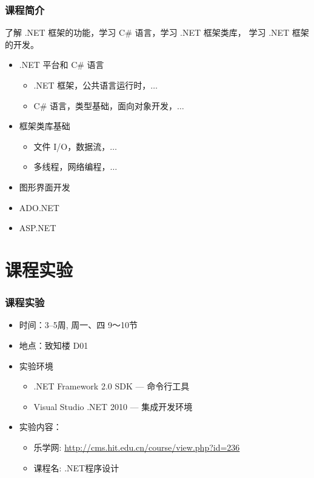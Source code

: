 \begin{frame}
\frametitle{课程简介}

\CJKindent 了解 .NET 框架的功能，学习 C\# 语言，学习 .NET 框架类库， 学习
.NET 框架的开发。

\begin{itemize}
\item .NET 平台和 C\# 语言
\begin{itemize}
\item .NET 框架，公共语言运行时，$\ldots$
\item C\# 语言，类型基础，面向对象开发，$\ldots$
\end{itemize}
\item 框架类库基础
  \begin{itemize}
  \item 文件 I/O，数据流，$\ldots$
  \item 多线程，网络编程，$\ldots$
  \end{itemize}
\item 图形界面开发
\item ADO.NET
\item ASP.NET
\end{itemize}
\end{frame}

\section{课程实验}
\begin{frame}
\frametitle{课程实验}
\begin{itemize}
    \setlength{\itemsep}{14pt plus 1pt}
 \item 时间：3--5周, 周一、四 9～10节
\item 地点：致知楼 D01
\item 实验环境
\begin{itemize}
    \setlength{\itemsep}{6pt plus 1pt}
\item .NET Framework 2.0 SDK --- 命令行工具
\item Visual Studio .NET 2010 --- 集成开发环境
\end{itemize}
\item 实验内容：
  \begin{itemize}
  \item 乐学网: \href{http://cms.hit.edu.cn/course/view.php?id=236}{http://cms.hit.edu.cn/course/view.php?id=236}
  \item 课程名: .NET程序设计
  \end{itemize}
\end{itemize}

\end{frame}

